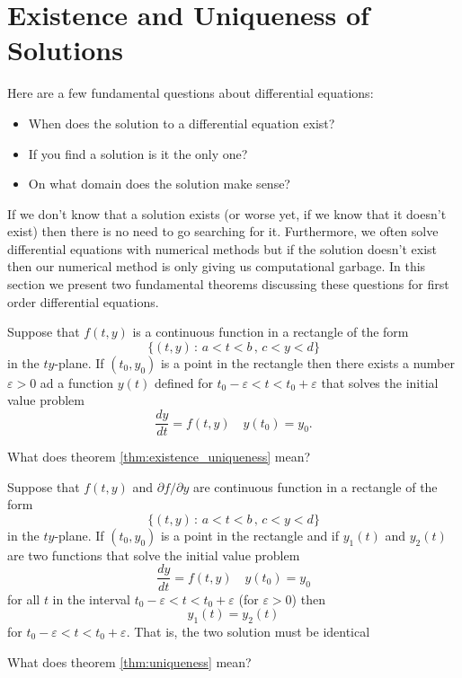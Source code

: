 \newpage\section{Existence and Uniqueness of Solutions}
Here are a few fundamental questions about differential equations:
\begin{itemize}
    \item When does the solution to a differential equation exist?
    \item If you find a solution is it the only one?
    \item On what domain does the solution make sense?
\end{itemize}
If we don't know that a solution exists (or worse yet, if we know that it doesn't exist)
then there is no need to go searching for it.  Furthermore, we often solve differential
equations with numerical methods but if the solution doesn't exist then our numerical
method is only giving us computational garbage. 
In this section we present two fundamental theorems discussing these questions for first
order differential equations.  

\begin{thm}\label{thm:existence_uniqueness}
    Suppose that $f(t,y)$ is a continuous function in a rectangle of the form
    \[ \{ (t,y) \, : \, a < t < b \, , \, c < y < d \} \]
    in the $ty$-plane.  If $(t_0,y_0)$ is a point in the rectangle then there exists a
    number $\varepsilon > 0$ ad a function $y(t)$ defined for $t_0 - \varepsilon < t < t_0
    + \varepsilon$ that solves the initial value problem
    \[ \frac{dy}{dt} = f(t,y) \quad y(t_0) = y_0 . \]
\end{thm}
\begin{problem}
    What does theorem \ref{thm:existence_uniqueness} mean?
\end{problem}


\begin{thm}\label{thm:uniqueness}
    Suppose that $f(t,y)$ and $\partial f/\partial y$ are continuous function in a
    rectangle of  the form 
    \[ \{ (t,y) \, : \, a < t < b \, , \, c < y < d \} \]
    in the $ty$-plane.  If $(t_0,y_0)$ is a point in the rectangle and if $y_1(t)$ and
    $y_2(t)$ are two functions that solve the initial value problem 
    \[ \frac{dy}{dt} = f(t,y) \quad y(t_0) = y_0  \]
    for all $t$ in the interval $t_0 - \varepsilon < t < t_0 + \varepsilon$ (for
    $\varepsilon >0$) then
    \[ y_1(t) = y_2(t) \]
    for $t_0 - \varepsilon < t < t_0 + \varepsilon$.  That is, the two solution must be
    identical
\end{thm}
\begin{problem}
    What does theorem \ref{thm:uniqueness} mean?
\end{problem}


